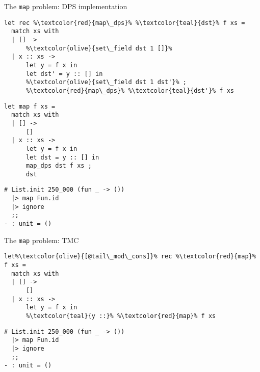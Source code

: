 \begin{frame}[fragile]{The \texttt{map} problem: DPS implementation}
\begin{adjustwidth}{-1.5em}{-1.5em}
\begin{minipage}{0.5\linewidth}
\begin{lstlisting}
let rec %\textcolor{red}{map\_dps}% %\textcolor{teal}{dst}% f xs =
  match xs with
  | [] ->
      %\textcolor{olive}{set\_field dst 1 []}%
  | x :: xs ->
      let y = f x in
      let dst' = y :: [] in
      %\textcolor{olive}{set\_field dst 1 dst'}% ;
      %\textcolor{red}{map\_dps}% %\textcolor{teal}{dst'}% f xs
\end{lstlisting}
\end{minipage}
\begin{minipage}{0.45\linewidth}
\begin{lstlisting}
let map f xs =
  match xs with
  | [] ->
      []
  | x :: xs ->
      let y = f x in
      let dst = y :: [] in
      map_dps dst f xs ;
      dst
\end{lstlisting}
\end{minipage}
\vfill
\begin{lstlisting}
# List.init 250_000 (fun _ -> ())
  |> map Fun.id
  |> ignore
  ;;
- : unit = ()
\end{lstlisting}
\end{adjustwidth}
\end{frame}

\begin{frame}[fragile]{The \texttt{map} problem: TMC}
\begin{lstlisting}
let%\textcolor{olive}{[@tail\_mod\_cons]}% rec %\textcolor{red}{map}% f xs =
  match xs with
  | [] ->
      []
  | x :: xs ->
      let y = f x in
      %\textcolor{teal}{y ::}% %\textcolor{red}{map}% f xs
\end{lstlisting}
\vfill
\begin{lstlisting}
# List.init 250_000 (fun _ -> ())
  |> map Fun.id
  |> ignore
  ;;
- : unit = ()
\end{lstlisting}
\end{frame}